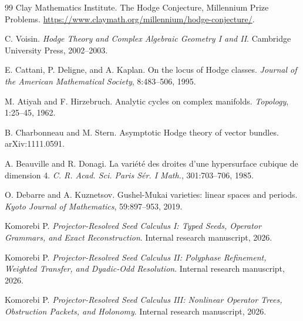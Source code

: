 \documentclass[11pt,oneside]{book}
\theoremstyle{definition}
\theoremstyle{remark}
\begin{document}
\begin{thebibliography}{99}
Clay Mathematics Institute.
\newblock The Hodge Conjecture, Millennium Prize Problems.
\newblock \url{https://www.claymath.org/millennium/hodge-conjecture/}.

C. Voisin.
\newblock \emph{Hodge Theory and Complex Algebraic Geometry I and II}.
\newblock Cambridge University Press, 2002--2003.

E. Cattani, P. Deligne, and A. Kaplan.
\newblock On the locus of Hodge classes.
\newblock \emph{Journal of the American Mathematical Society}, 8:483--506, 1995.

M. Atiyah and F. Hirzebruch.
\newblock Analytic cycles on complex manifolds.
\newblock \emph{Topology}, 1:25--45, 1962.

B. Charbonneau and M. Stern.
\newblock Asymptotic Hodge theory of vector bundles.
\newblock arXiv:1111.0591.

A. Beauville and R. Donagi.
\newblock La vari\'et\'e des droites d'une hypersurface cubique de dimension 4.
\newblock \emph{C. R. Acad. Sci. Paris S\'er. I Math.}, 301:703--706, 1985.

O. Debarre and A. Kuznetsov.
\newblock Gushel-Mukai varieties: linear spaces and periods.
\newblock \emph{Kyoto Journal of Mathematics}, 59:897--953, 2019.

Komorebi P.
\newblock \emph{Projector-Resolved Seed Calculus I: Typed Seeds, Operator Grammars, and Exact Reconstruction}.
\newblock Internal research manuscript, 2026.

Komorebi P.
\newblock \emph{Projector-Resolved Seed Calculus II: Polyphase Refinement, Weighted Transfer, and Dyadic-Odd Resolution}.
\newblock Internal research manuscript, 2026.

Komorebi P.
\newblock \emph{Projector-Resolved Seed Calculus III: Nonlinear Operator Trees, Obstruction Packets, and Holonomy}.
\newblock Internal research manuscript, 2026.
\end{thebibliography}
\end{document}
